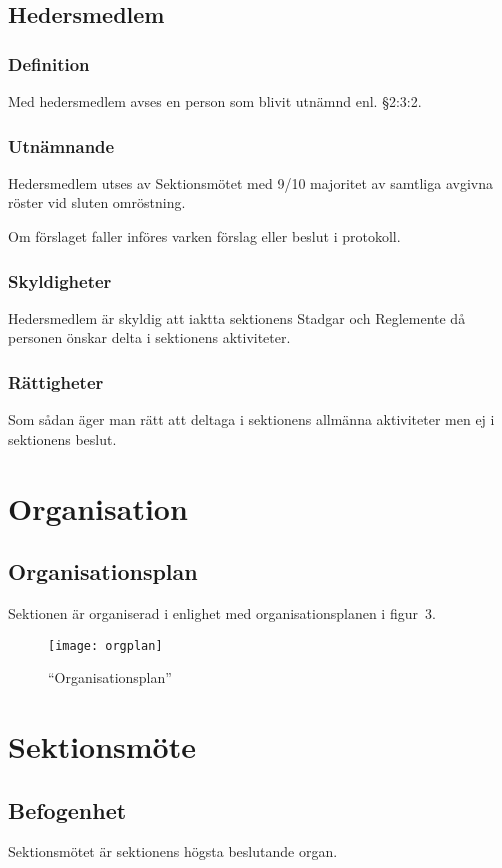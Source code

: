 \documentclass[10pt]{article}
\begin{document}
\subsection{Hedersmedlem}
\subsubsection{Definition}
Med hedersmedlem avses en person som blivit utnämnd enl. §2:3:2.

\subsubsection{Utnämnande}
Hedersmedlem utses av Sektionsmötet med 9/10 majoritet av samtliga avgivna
röster vid sluten omröstning.

Om förslaget faller införes varken förslag eller beslut i protokoll.

\subsubsection{Skyldigheter}
Hedersmedlem är skyldig att iaktta sektionens Stadgar och Reglemente då
personen önskar delta i sektionens aktiviteter.

\subsubsection{Rättigheter}
Som sådan äger man rätt att deltaga i sektionens allmänna aktiviteter men ej
i sektionens beslut.
\newpage

\section{Organisation}
\subsection{Organisationsplan}
Sektionen är organiserad i enlighet med organisationsplanen i figur~3.
\begin{figure}[h!tbp]
    \centering
    \texttt{[image: orgplan]}
    \caption{``Organisationsplan''}%
    \label{fig:orgplan}%
\end{figure}%
\newpage

\section{Sektionsmöte}
\subsection{Befogenhet}
Sektionsmötet är sektionens högsta beslutande organ.
\end{document}
